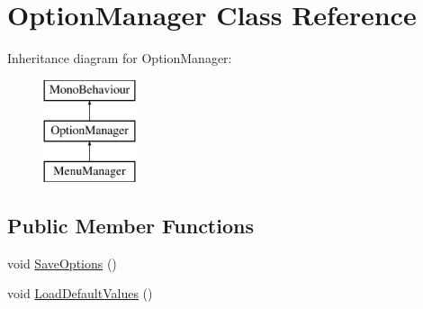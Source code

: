 \hypertarget{class_option_manager}{}\section{Option\+Manager Class Reference}
\label{class_option_manager}
Inheritance diagram for Option\+Manager\+:\begin{figure}[H]
\begin{center}
\leavevmode
\includegraphics[height=3.000000cm]{class_option_manager}
\end{center}
\end{figure}
\subsection*{Public Member Functions}
\begin{DoxyCompactItemize}
\item 
void \mbox{\hyperlink{class_option_manager_af95bd2a017f1bdb855bfc58faf79f963}{Save\+Options}} ()
\item 
void \mbox{\hyperlink{class_option_manager_acc81471769ebb4dd06e38321979a2b75}{Load\+Default\+Values}} ()
\end{DoxyCompactItemize}
